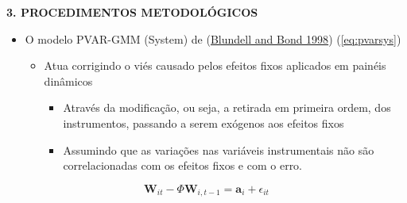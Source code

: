 \documentclass[
  ignorenonframetext,
  aspectratio=169,
  ignorenonframetext]{beamer}
\providecommand{\tightlist}{%
  \setlength{\itemsep}{0pt}\setlength{\parskip}{0pt}}
\begin{document}
\begin{frame}{\textbf{3. PROCEDIMENTOS METODOLÓGICOS}}
\protect\hypertarget{procedimentos-metodoluxf3gicos-7}{}
\begin{itemize}
\tightlist
\item
  O modelo PVAR-GMM (System) de
  (\protect\hyperlink{ref-blundelbond:1998}{Blundell and Bond 1998})
  (\autoref{eq:pvarsys})

  \begin{itemize}
  \tightlist
  \item
    Atua corrigindo o viés causado pelos efeitos fixos aplicados em
    painéis dinâmicos

    \begin{itemize}
    \tightlist
    \item
      Através da modificação, ou seja, a retirada em primeira ordem, dos
      instrumentos, passando a serem exógenos aos efeitos fixos
    \item
      Assumindo que as variações nas variáveis instrumentais não são
      correlacionadas com os efeitos fixos e com o erro.
    \end{itemize}
  \end{itemize}
\end{itemize}

\begin{equation}
\mathbf{W}_{it} - \Phi\mathbf{W}_{i, t-1} = \mathbf{a}_{i} + \epsilon_{it}  
\end{equation}
\end{frame}
\end{document}
